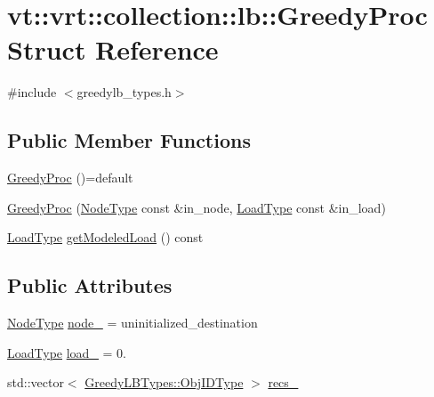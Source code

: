 \hypertarget{structvt_1_1vrt_1_1collection_1_1lb_1_1_greedy_proc}{}\section{vt\+:\+:vrt\+:\+:collection\+:\+:lb\+:\+:Greedy\+Proc Struct Reference}
\label{structvt_1_1vrt_1_1collection_1_1lb_1_1_greedy_proc}


{\ttfamily \#include $<$greedylb\+\_\+types.\+h$>$}

\subsection*{Public Member Functions}
\begin{DoxyCompactItemize}
\item 
\hyperlink{structvt_1_1vrt_1_1collection_1_1lb_1_1_greedy_proc_acbbebf3b853047385b532825ae8f21fe}{Greedy\+Proc} ()=default
\item 
\hyperlink{structvt_1_1vrt_1_1collection_1_1lb_1_1_greedy_proc_af702b8f3b439fbaaed9ea82c3d6c72e1}{Greedy\+Proc} (\hyperlink{namespacevt_a866da9d0efc19c0a1ce79e9e492f47e2}{Node\+Type} const \&in\+\_\+node, \hyperlink{namespacevt_a8fb51741340b87d7aaee0bef60e9896b}{Load\+Type} const \&in\+\_\+load)
\item 
\hyperlink{namespacevt_a8fb51741340b87d7aaee0bef60e9896b}{Load\+Type} \hyperlink{structvt_1_1vrt_1_1collection_1_1lb_1_1_greedy_proc_a9a9706a2b8dcdda14a47094641e4e619}{get\+Modeled\+Load} () const
\end{DoxyCompactItemize}
\subsection*{Public Attributes}
\begin{DoxyCompactItemize}
\item 
\hyperlink{namespacevt_a866da9d0efc19c0a1ce79e9e492f47e2}{Node\+Type} \hyperlink{structvt_1_1vrt_1_1collection_1_1lb_1_1_greedy_proc_aad516b90985606d8d27ddd89e0109a6a}{node\+\_\+} = uninitialized\+\_\+destination
\item 
\hyperlink{namespacevt_a8fb51741340b87d7aaee0bef60e9896b}{Load\+Type} \hyperlink{structvt_1_1vrt_1_1collection_1_1lb_1_1_greedy_proc_a7dd671258d32531fcc4321d956f253e0}{load\+\_\+} = 0.
\item 
std\+::vector$<$ \hyperlink{structvt_1_1vrt_1_1collection_1_1lb_1_1_greedy_l_b_types_ae22670acd689e4ff83315fac2e4acb5e}{Greedy\+L\+B\+Types\+::\+Obj\+I\+D\+Type} $>$ \hyperlink{structvt_1_1vrt_1_1collection_1_1lb_1_1_greedy_proc_a601dd3243831370af2d1e791152902b3}{recs\+\_\+}
\end{DoxyCompactItemize}


